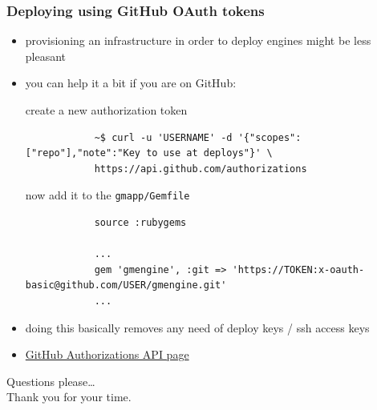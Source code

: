 \documentclass[compress]{beamer}
\begin{document}
\begin{frame}[fragile]
\frametitle{Deploying using GitHub OAuth tokens}
\begin{itemize}
  \item provisioning an infrastructure in order to deploy engines might be less pleasant
  \item you can help it a bit if you are on GitHub:
    \begin{itemize}
        \begin{item} create a new authorization token
          \begin{verbatim}
            ~$ curl -u 'USERNAME' -d '{"scopes":["repo"],"note":"Key to use at deploys"}' \
            https://api.github.com/authorizations
          \end{verbatim}
        \end{item}

        \begin{item} now add it to the \texttt{gmapp/Gemfile}
          \begin{verbatim}
            source :rubygems

            ...
            gem 'gmengine', :git => 'https://TOKEN:x-oauth-basic@github.com/USER/gmengine.git'
            ...
          \end{verbatim}
        \end{item}
    \end{itemize}
  \item doing this basically removes any need of deploy keys / ssh access keys
  \item \href{http://developer.github.com/v3/oauth/#oauth-authorizations-api}{GitHub Authorizations API page}
\end{itemize}
\end{frame}

\begin{frame}
  \begin{center}
  \huge Questions please\ldots
  \\
  Thank you for your time.
  \end{center}
\end{frame}
\end{document}
